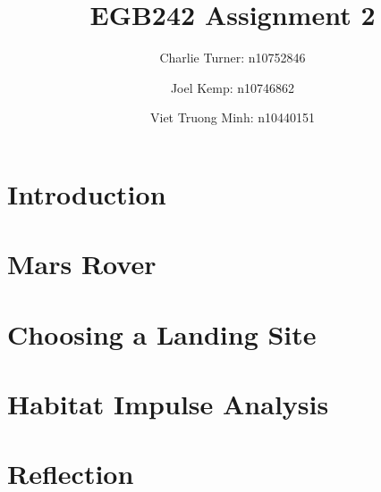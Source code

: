 \documentclass[a4paper]{report}
\author{
    Charlie Turner: n10752846
    \and
    Joel Kemp: n10746862
    \and
    Viet Truong Minh: n10440151
    }
\title{EGB242 Assignment 2}
\begin{document}
    \begin{titlepage}
        \maketitle
    \end{titlepage}

    \section{Introduction}
    
    \section{Mars Rover}
    \section{Choosing a Landing Site}
    \section{Habitat Impulse Analysis}
    \section{Reflection}
\end{document}
